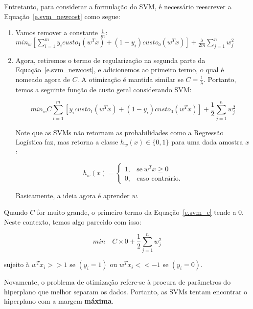 Entretanto, para considerar a formulação do SVM, é necessário reescrever a Equação~\ref{e.svm_newcost} como segue:

\begin{enumerate}
\item Vamos remover a constante $\frac{1}{m}$:\\
$min_w [\sum\limits_{i=1}^m y_i custo_1(w^Tx) + (1-y_i)custo_o(w^Tx)] + \frac{\lambda}{2m} \sum\limits_{j=1}^n w_j^2$
\item Agora, retiremos o termo de regularização na segunda parte da Equação~\ref{e.svm_newcost}, e adicionemos ao primeiro termo, o qual é nomeado agora de $C$. A otimização é mantida similar se $C = \frac{1}{\lambda}$. Portanto, temos a seguinte função de custo geral considerando SVM:

\begin{equation}
\label{e.svm_c}
min_w C \sum\limits_{i=1}^m[y_i custo_1(w^Tx) + (1-y_i)custo_0(w^Tx)]+\frac{1}{2} \sum\limits_{j=1}^n w_j^2
\end{equation}

Note que as SVMs não retornam as probabilidades como a Regressão Logística faz, mas retorna a classe $h_w(x) \in \{0, 1\}$ para uma dada amostra $x$:

\begin{equation}
\label{e.svm_classes}
h_w(x) =
   \begin{cases}
      1, & \text{se}\ w^Tx \geq 0 \\
      0, & \text{caso contrário}.
    \end{cases}
\end{equation}

Basicamente, a ideia agora é aprender $w$.
\end{enumerate}

Quando $C$ for muito grande, o primeiro termo da Equação~\ref{e.svm_c} tende a 0. Neste contexto, temos algo parecido com isso:

\begin{equation}
\label{e.svm_c_zero}
min \quad C \times 0 + \frac{1}{2}\sum\limits_{j=1}^n w_j^2
\end{equation}
\begin{center}
sujeito à $w^Tx_i >> 1$ se $(y_i = 1)$ ou $w^Tx_i << -1$ se $(y_i = 0)$.
\end{center}

Novamente, o problema de otimização refere-se à procura de parâmetros do hiperplano que melhor separam os dados. Portanto, as SVMs tentam encontrar o hiperplano com a margem \textbf{máxima}.\\

